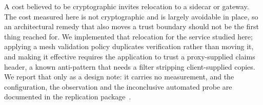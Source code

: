 \documentclass[preprint,12pt,authoryear]{elsarticle}
\begin{document}
A cost believed to be cryptographic invites relocation to a sidecar or gateway.
The cost measured here is not cryptographic and is largely avoidable in place,
so an architectural remedy that also moves a trust boundary should not be the
first thing reached for. We implemented that relocation for the service
studied here; applying a mesh validation policy duplicates verification rather
than moving it, and making it effective requires the application to trust a
proxy-supplied claims header, a known anti-pattern that needs a filter
stripping client-supplied copies. We report that only as a design note: it
carries no measurement, and the configuration, the observation and the
inconclusive automated probe are documented in the replication
package~\citep{artifact2026}.





\end{document}
